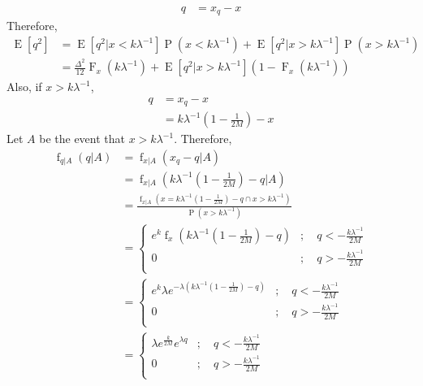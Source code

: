 \documentclass[titlepage, fleqn, a4paper, 12pt, twoside]{article}
\theoremstyle{definition}
\theoremstyle{theorem}
\DeclareMathOperator{\cdf}{\mathrm{F}}
\DeclareMathOperator{\pdf}{\mathrm{f}}
\DeclareMathOperator{\prob}{\mathrm{P}}
\DeclareMathOperator{\expct}{\mathrm{E}}
\begin{document}
\begin{solution}
	\begin{align*}
		q &= x_q - x
	\end{align*}
	Therefore,
	\begin{align*}
		\expct\left[ q^2 \right] &= \expct\left[ q^2 \Big| x < k \lambda^{-1} \right] \prob\left( x < k \lambda^{-1} \right) + \expct\left[ q^2 \Big| x > k \lambda^{-1} \right] \prob\left( x > k \lambda^{-1} \right)\\
		&= \frac{\Delta^2}{12} \cdf_x\left( k \lambda^{-1} \right) + \expct\left[ q^2 \Big| x > k \lambda^{-1} \right] \left( 1 - \cdf_x\left( k \lambda^{-1} \right) \right)
	\end{align*}
	Also, if $x > k \lambda^{-1}$,
	\begin{align*}
		q &= x_q - x\\
		&= k \lambda^{-1} \left( 1 - \frac{1}{2 M} \right) - x
	\end{align*}
	Let $A$ be the event that $x > k \lambda^{-1}$.
	Therefore,
	\begin{align*}
		\pdf_{q|A}(q|A) &= \pdf_{x|A}(x_q - q | A)\\
		&= \pdf_{x|A}\left( k \lambda^{-1} \left( 1 - \frac{1}{2 M} \right) - q \Big| A \right)\\
		&= \frac{\pdf_{x|A}\left( x = k \lambda^{-1} \left( 1 - \frac{1}{2 M} \right) - q \cap x > k \lambda^{-1} \right)}{\prob\left( x > k \lambda^{-1} \right)}\\
		&=
			\begin{cases}
				e^k \pdf_x\left( k \lambda^{-1} \left( 1 - \frac{1}{2 M} \right) - q \right) &;\quad q < -\frac{k \lambda^{-1}}{2 M}\\
				0 &;\quad q > -\frac{k \lambda^{-1}}{2 M}\\
			\end{cases}\\
		&=
			\begin{cases}
				e^k \lambda e^{-\lambda \left( k \lambda^{-1} \left( 1 - \frac{1}{2 M} \right) - q \right)} &;\quad q < -\frac{k \lambda^{-1}}{2 M}\\
				0 &;\quad q > -\frac{k \lambda^{-1}}{2 M}\\
			\end{cases}\\
		&=
			\begin{cases}
				\lambda e^{\frac{k}{2 M}} e^{\lambda q} &;\quad q < -\frac{k \lambda^{-1}}{2 M}\\
				0 &;\quad q > -\frac{k \lambda^{-1}}{2 M}\\

\end{cases}
\end{align*}
\end{solution}
\end{document}
